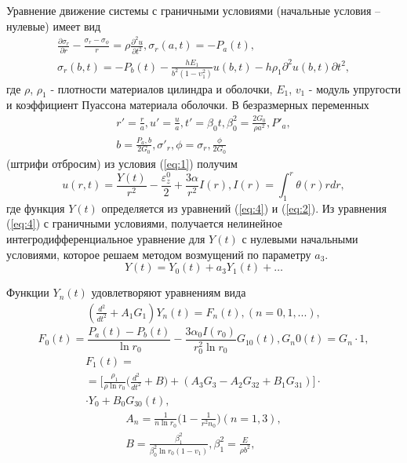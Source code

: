 Уравнение движение системы с граничными условиями (начальные условия – нулевые) имеет вид 
\begin{equation}\label{eq:4}
    \begin{gathered}
        \frac{\partial\sigma_r}{\partial r}-\frac{\sigma_r-\sigma_\phi}{r}=\rho\frac{\partial^2u}{\partial t^2}, \sigma_r(a,t)=-P_a(t), \\
        \sigma_r(b,t)=-P_b(t)-\frac{hE_1}{b^2 (1-\upsilon^2_1)}u(b,t)-h\rho_1{\partial^2u(b,t)}{\partial t^2},
    \end{gathered}
\end{equation}
\noindent где $\rho$, $\rho_1$ - плотности материалов цилиндра и оболочки,
$E_1$, $v_1$ - модуль упругости и коэффициент Пуассона материала оболочки. В безразмерных переменных
\begin{equation*}
    \begin{gathered}
        r'=\frac{r}{a}, u'=\frac{u}{a}, t'=\beta_0t, \beta^2_0=\frac{2G_0}{\rho a^2}, P'_a, \\
        b=\frac{P_a,b}{2G_0}, \sigma'_r,\phi=\sigma_r,\frac{\phi}{2G_0}
    \end{gathered}
\end{equation*}
(штрифи отбросим) из условия (\ref{eq:1}) получим 
$$u(r,t)=\frac{Y(t)}{r^2}-\frac{\varepsilon^0_z}{2}+\frac{3\alpha}{r^2}I(r), I(r)=\int^{r}_{1} \theta(r)rdr,$$
\noindent где функция $Y(t)$ определяется из уравнений (\ref{eq:4}) и (\ref{eq:2}). Из уравнения (\ref{eq:4}) с граничными условиями,
получается нелинейное интегродифференциальное уравнение для $Y(t)$ с нулевыми начальными условиями, которое решаем методом возмущений по параметру $a_3$.
$$Y(t)=Y_0(t)+a_3Y_1(t)+\ldots$$

Функции $Y_n(t)$ удовлетворяют уравнениям вида
\begin{equation}\label{eq:5}
    \begin{gathered}
        (\frac{d^2}{dt^2}+A_1 G_1)Y_n(t)=F_n(t), (n=0,1,...),
    \end{gathered}
\end{equation}
$$F_0(t)=\frac{P_a(t)-P_b(t)}{\ln r_0}-\frac{3\alpha_0I(r_0)}{r^2_0\ln r_0}G_10(t), G_n0(t)=G_n \cdot 1,$$
\begin{equation*}
    \begin{gathered}
        F_1(t)= \\
        =\bigg[\frac{\rho_1}{\rho\ln r_0}\bigg(\frac{d^2}{dt^2}+B\bigg)+(A_3 G_3 - A_2 G_{32} + B_1 G_{31})\bigg] \cdot \\
        \cdot Y_0+B_0 G_{30}(t),
    \end{gathered}
\end{equation*}
\begin{equation*}
    \begin{gathered}
        A_n=\frac{1}{n\ln r_0}\bigg(1-\frac{1}{r^2n_0}\bigg) (n=1,3), \\
        B=\frac{\beta^2_1}{\beta^2_0\ln r_0(1-v_1)}, \beta^2_1=\frac{E}{\rho b^2},
    \end{gathered}
\end{equation*}

